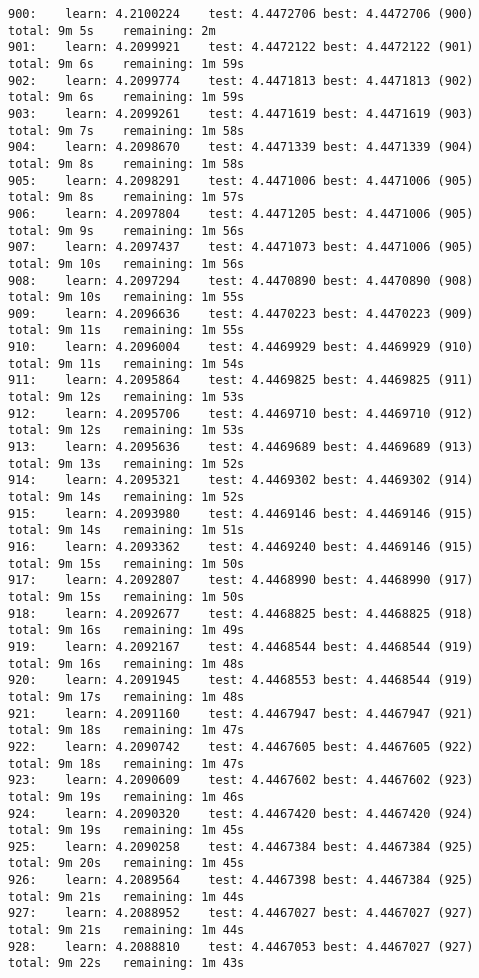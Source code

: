 \documentclass[11pt]{article}
\begin{document}
\begin{Verbatim}[commandchars=\\\{\}]
900:	learn: 4.2100224	test: 4.4472706	best: 4.4472706 (900)	total: 9m 5s	remaining: 2m
901:	learn: 4.2099921	test: 4.4472122	best: 4.4472122 (901)	total: 9m 6s	remaining: 1m 59s
902:	learn: 4.2099774	test: 4.4471813	best: 4.4471813 (902)	total: 9m 6s	remaining: 1m 59s
903:	learn: 4.2099261	test: 4.4471619	best: 4.4471619 (903)	total: 9m 7s	remaining: 1m 58s
904:	learn: 4.2098670	test: 4.4471339	best: 4.4471339 (904)	total: 9m 8s	remaining: 1m 58s
905:	learn: 4.2098291	test: 4.4471006	best: 4.4471006 (905)	total: 9m 8s	remaining: 1m 57s
906:	learn: 4.2097804	test: 4.4471205	best: 4.4471006 (905)	total: 9m 9s	remaining: 1m 56s
907:	learn: 4.2097437	test: 4.4471073	best: 4.4471006 (905)	total: 9m 10s	remaining: 1m 56s
908:	learn: 4.2097294	test: 4.4470890	best: 4.4470890 (908)	total: 9m 10s	remaining: 1m 55s
909:	learn: 4.2096636	test: 4.4470223	best: 4.4470223 (909)	total: 9m 11s	remaining: 1m 55s
910:	learn: 4.2096004	test: 4.4469929	best: 4.4469929 (910)	total: 9m 11s	remaining: 1m 54s
911:	learn: 4.2095864	test: 4.4469825	best: 4.4469825 (911)	total: 9m 12s	remaining: 1m 53s
912:	learn: 4.2095706	test: 4.4469710	best: 4.4469710 (912)	total: 9m 12s	remaining: 1m 53s
913:	learn: 4.2095636	test: 4.4469689	best: 4.4469689 (913)	total: 9m 13s	remaining: 1m 52s
914:	learn: 4.2095321	test: 4.4469302	best: 4.4469302 (914)	total: 9m 14s	remaining: 1m 52s
915:	learn: 4.2093980	test: 4.4469146	best: 4.4469146 (915)	total: 9m 14s	remaining: 1m 51s
916:	learn: 4.2093362	test: 4.4469240	best: 4.4469146 (915)	total: 9m 15s	remaining: 1m 50s
917:	learn: 4.2092807	test: 4.4468990	best: 4.4468990 (917)	total: 9m 15s	remaining: 1m 50s
918:	learn: 4.2092677	test: 4.4468825	best: 4.4468825 (918)	total: 9m 16s	remaining: 1m 49s
919:	learn: 4.2092167	test: 4.4468544	best: 4.4468544 (919)	total: 9m 16s	remaining: 1m 48s
920:	learn: 4.2091945	test: 4.4468553	best: 4.4468544 (919)	total: 9m 17s	remaining: 1m 48s
921:	learn: 4.2091160	test: 4.4467947	best: 4.4467947 (921)	total: 9m 18s	remaining: 1m 47s
922:	learn: 4.2090742	test: 4.4467605	best: 4.4467605 (922)	total: 9m 18s	remaining: 1m 47s
923:	learn: 4.2090609	test: 4.4467602	best: 4.4467602 (923)	total: 9m 19s	remaining: 1m 46s
924:	learn: 4.2090320	test: 4.4467420	best: 4.4467420 (924)	total: 9m 19s	remaining: 1m 45s
925:	learn: 4.2090258	test: 4.4467384	best: 4.4467384 (925)	total: 9m 20s	remaining: 1m 45s
926:	learn: 4.2089564	test: 4.4467398	best: 4.4467384 (925)	total: 9m 21s	remaining: 1m 44s
927:	learn: 4.2088952	test: 4.4467027	best: 4.4467027 (927)	total: 9m 21s	remaining: 1m 44s
928:	learn: 4.2088810	test: 4.4467053	best: 4.4467027 (927)	total: 9m 22s	remaining: 1m 43s

\end{Verbatim}
\end{document}
